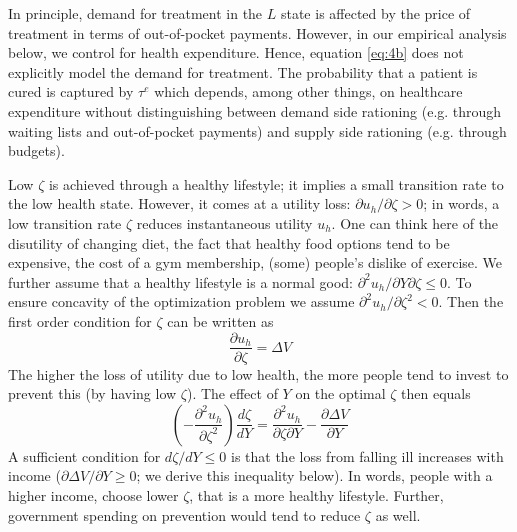 \documentclass[12pt,english,a4paper]{article}
\begin{document}
In principle, demand for treatment in the \(L\) state is affected by the price of treatment in terms of out-of-pocket payments. However, in our empirical analysis below, we control for health expenditure. Hence, equation \eqref{eq:4b} does not explicitly model the demand for treatment. The probability that a patient is cured is captured by \(\tau^e\) which depends, among other things, on healthcare expenditure without distinguishing between demand side rationing (e.g. through waiting lists and out-of-pocket payments) and supply side rationing (e.g. through budgets).

Low \(\zeta\) is achieved through a healthy lifestyle; it implies a small transition rate to the low health state. However, it comes at a utility loss: \(\partial u_h/ \partial \zeta > 0\); in words, a low transition rate \(\zeta\) reduces instantaneous utility \(u_h\). One can think here of the disutility of changing diet, the fact that healthy food options tend to be expensive, the cost of a gym membership, (some) people's dislike of exercise. We further assume that a healthy lifestyle is a normal good: \(\partial^2 u_h/ \partial Y \partial \zeta  \leq 0\). To ensure concavity of the optimization problem we assume \(\partial^2 u_h / \partial \zeta^2 <0\). Then the first order condition for \(\zeta\) can be written as
\begin{equation}
\label{eq:5}
\frac{\partial u_h}{\partial \zeta} = \Delta V
\end{equation}
The higher the loss of utility due to low health, the more people tend to invest to prevent this (by having low \(\zeta\)). The effect of \(Y\) on the optimal \(\zeta\) then equals
\begin{equation}
\label{eq:6}
\left(- \frac{\partial^2 u_h}{\partial \zeta^2}\right) \frac{d\zeta}{dY} = \frac{\partial^2 u_h}{\partial \zeta \partial Y} - \frac{\partial \Delta V}{\partial Y} 
\end{equation}
A sufficient condition for \(d\zeta/dY \leq 0\) is that the loss from falling ill increases with income (\(\partial \Delta V/\partial Y \geq 0\); we derive this inequality below). In words, people with a higher income, choose lower \(\zeta\), that is a more healthy lifestyle. Further, government spending on prevention would tend to reduce \(\zeta\) as well.
\end{document}
